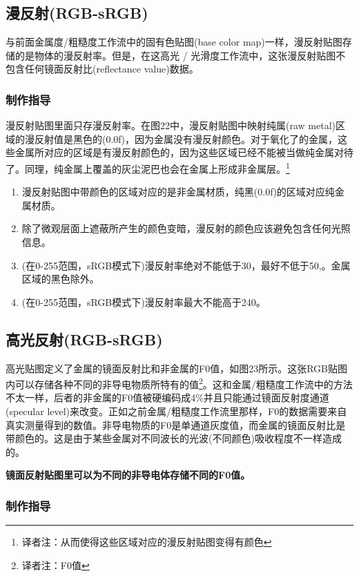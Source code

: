 \subsection{漫反射(RGB-sRGB)}

与前面金属度/粗糙度工作流中的固有色贴图(base color map)一样，漫反射贴图存储的是物体的漫反射率。但是，在这高光 / 光滑度工作流中，这张漫反射贴图不包含任何镜面反射比(reflectance value)数据。

\subsubsection{制作指导}

漫反射贴图里面只存漫反射率。在图22中，漫反射贴图中映射纯属(raw metal)区域的漫反射值是黑色的(0.0f)，因为金属没有漫反射颜色。对于氧化了的金属，这些金属所对应的区域是有漫反射颜色的，因为这些区域已经不能被当做纯金属对待了。同理，纯金属上覆盖的灰尘泥巴也会在金属上形成非金属层。\footnote{译者注：从而使得这些区域对应的漫反射贴图变得有颜色}

\begin{enumerate}
\item 漫反射贴图中带颜色的区域对应的是非金属材质，纯黑(0.0f)的区域对应纯金属材质。
\item 除了微观层面上遮蔽所产生的颜色变暗，漫反射的颜色应该避免包含任何光照信息。
\item (在0-255范围，sRGB模式下)漫反射率绝对不能低于30，最好不低于50,。金属区域的黑色除外。
\item (在0-255范围，sRGB模式下)漫反射率最大不能高于240。
\end{enumerate}

\subsection{高光反射(RGB-sRGB)}

高光贴图定义了金属的镜面反射比和非金属的F0值，如图23所示。这张RGB贴图内可以存储各种不同的非导电物质所特有的值\footnote{译者注：F0值}。这和金属/粗糙度工作流中的方法不太一样，后者的非金属的F0值被硬编码成4\%并且只能通过镜面反射度通道(specular level)来改变。正如之前金属/粗糙度工作流里那样，F0的数据需要来自真实测量得到的数值。非导电物质的F0是单通道灰度值，而金属的镜面反射比是带颜色的。这是由于某些金属对不同波长的光波(不同颜色)吸收程度不一样造成的。

\textbf{镜面反射贴图里可以为不同的非导电体存储不同的F0值。}

\subsubsection{制作指导}


